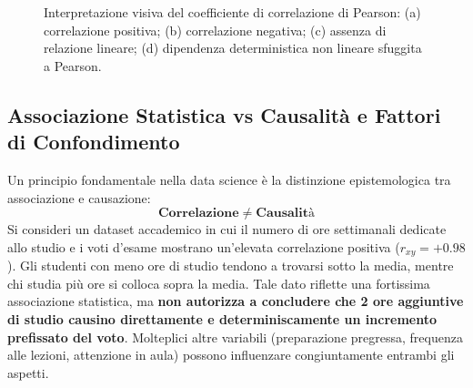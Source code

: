 \begin{figure}[H]
\vspace{0.4cm}
\begin{minipage}{0.47\textwidth}
\centering
{}
\end{minipage}%
\hfill
\begin{minipage}{0.47\textwidth}
\centering
{}
\end{minipage}
\caption{Interpretazione visiva del coefficiente di correlazione di Pearson: (a) correlazione positiva; (b) correlazione negativa; (c) assenza di relazione lineare; (d) dipendenza deterministica non lineare sfuggita a Pearson.}
\label{fig:pearson-cases}
\end{figure}

\subsection{Associazione Statistica vs Causalit\`a e Fattori di Confondimento}
Un principio fondamentale nella data science \`e la distinzione epistemologica tra associazione e causazione:
\begin{equation}
\textbf{Correlazione} \;\neq\; \textbf{Causalit\`a}
\end{equation}
Si consideri un dataset accademico in cui il numero di ore settimanali dedicate allo studio e i voti d'esame mostrano un'elevata correlazione positiva ($r_{xy} = +0.98$). Gli studenti con meno ore di studio tendono a trovarsi sotto la media, mentre chi studia pi\`u ore si colloca sopra la media. Tale dato riflette una fortissima associazione statistica, ma \textbf{non autorizza a concludere che 2 ore aggiuntive di studio causino direttamente e determiniscamente un incremento prefissato del voto}. Molteplici altre variabili (preparazione pregressa, frequenza alle lezioni, attenzione in aula) possono influenzare congiuntamente entrambi gli aspetti.


